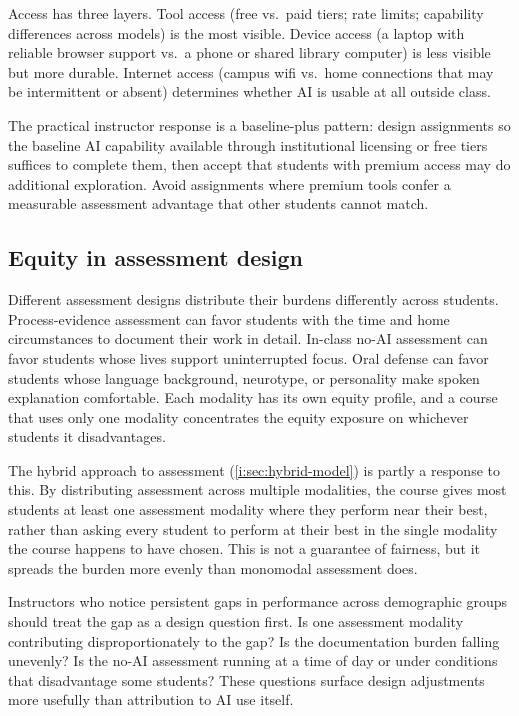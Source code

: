 \documentclass{SIAMbook2023}
\begin{document}
Access has three layers. Tool access (free vs.\ paid tiers; rate limits; capability differences across models) is the most visible. Device access (a laptop with reliable browser support vs.\ a phone or shared library computer) is less visible but more durable. Internet access (campus wifi vs.\ home connections that may be intermittent or absent) determines whether AI is usable at all outside class.

The practical instructor response is a baseline-plus pattern: design assignments so the baseline AI capability available through institutional licensing or free tiers suffices to complete them, then accept that students with premium access may do additional exploration. Avoid assignments where premium tools confer a measurable assessment advantage that other students cannot match.

\subsection{Equity in assessment design}
\label{i:subsec:equity-assessment}

Different assessment designs distribute their burdens differently across students. Process-evidence assessment can favor students with the time and home circumstances to document their work in detail. In-class no-AI assessment can favor students whose lives support uninterrupted focus. Oral defense can favor students whose language background, neurotype, or personality make spoken explanation comfortable. Each modality has its own equity profile, and a course that uses only one modality concentrates the equity exposure on whichever students it disadvantages.

The hybrid approach to assessment (\cref{i:sec:hybrid-model}) is partly a response to this. By distributing assessment across multiple modalities, the course gives most students at least one assessment modality where they perform near their best, rather than asking every student to perform at their best in the single modality the course happens to have chosen. This is not a guarantee of fairness, but it spreads the burden more evenly than monomodal assessment does.

Instructors who notice persistent gaps in performance across demographic groups should treat the gap as a design question first. Is one assessment modality contributing disproportionately to the gap? Is the documentation burden falling unevenly? Is the no-AI assessment running at a time of day or under conditions that disadvantage some students? These questions surface design adjustments more usefully than attribution to AI use itself.
\end{document}
